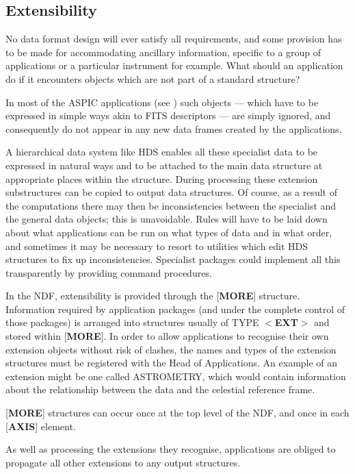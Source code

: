 \documentclass[twoside,11pt,nolof,noabs]{starlink}
\begin{document}
\subsection*{Extensibility}
No data format design will ever satisfy all requirements, and
some provision has to be made for accommodating ancillary
information, specific to a group of applications or a
particular instrument for example.  What should an application
do if it encounters objects which are not part of a
standard structure?

In most of the {\small ASPIC} applications (see ) such objects ---
which have to be expressed in simple ways akin to {\small FITS}
descriptors ---
are simply ignored, and consequently do not appear in any new data
frames created by the applications.

A hierarchical data system like HDS enables all these specialist data
to be expressed in natural ways and to be attached
to the main data structure at appropriate places within the structure.
During
processing these extension substructures can be copied to
output data structures.
Of course, as a result of the computations there may
then be inconsistencies
between the specialist and the general data objects;  this is
unavoidable.  Rules will have to be laid down about what applications
can be run on what types of data and in what order, and sometimes
it may be necessary to resort to
utilities which edit HDS structures to fix up inconsistencies.
Specialist packages could implement all this transparently by
providing command procedures.

In the NDF, extensibility is provided through the [\textbf{MORE}{]}
structure.  Information required by application packages (and
under the complete control of those packages) is arranged
into structures usually of TYPE $<$\textbf{EXT}$>$ and stored within
[\textbf{MORE}{]}.
In order to allow
applications to recognise their own extension objects
without risk of clashes, the
names and types of the extension structures
must be registered with the Head of Applications.  An
example of an extension might be one called ASTROMETRY, which
would contain information about the relationship between
the data and the celestial reference frame.

[\textbf{MORE}{]} structures can occur once
at the top level of the NDF, and
once in each [\textbf{AXIS}{]} element.

As well as processing the extensions they recognise, applications
are obliged to propagate all other extensions to any output
structures.
\end{document}
